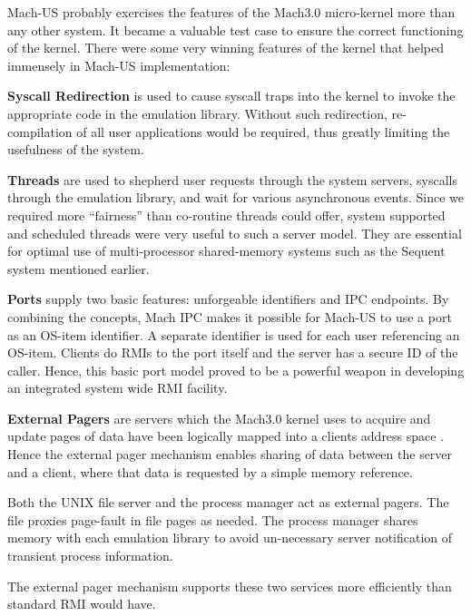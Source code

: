 Mach-US probably exercises the features of the Mach3.0 micro-kernel
more than any other system.  It became a valuable test case to ensure
the correct functioning of the kernel.
There were some very winning features of
the kernel that helped immensely in Mach-US implementation:
\begin{description}
\item{\bf Syscall Redirection} is used
to cause syscall traps into the kernel to
invoke the appropriate code in the emulation library.  Without such
redirection, re-compilation of all user applications would be required, thus
greatly limiting the usefulness of the system.

\item{\bf Threads} are
used to shepherd user requests through the system servers,
syscalls through the emulation library, and wait for various asynchronous
events.  Since we required more ``fairness'' than co-routine threads
could offer, system supported and scheduled threads were very useful to such
a server model.  They are essential for optimal use of
multi-processor shared-memory systems such as the Sequent system mentioned
earlier.

\item{\bf Ports} supply two basic features: unforgeable identifiers and IPC
endpoints. By combining the concepts, Mach IPC makes it possible for Mach-US
to use a port as an OS-item identifier.  A separate identifier is used
for each user referencing an OS-item.  Clients do RMIs to the port
itself and the server has a secure ID of the caller.  Hence, this basic
port model proved to be
a powerful weapon in developing an integrated system wide
RMI facility.

\item{\bf External Pagers} are servers which the Mach3.0 kernel uses to
acquire and update pages of
data have been logically mapped into a clients address space
\cite{EXT-PAGER}.
Hence the external pager mechanism enables sharing of data between the
server and a client, where that data is requested by a simple
memory reference.

Both the UNIX file server and the process manager act as external pagers.
The file proxies page-fault in file pages as needed.
The process manager shares memory with each emulation library to avoid
un-necessary server notification of transient process information.

The external pager mechanism supports
these two services more efficiently than
standard RMI would have.


\end{description}
